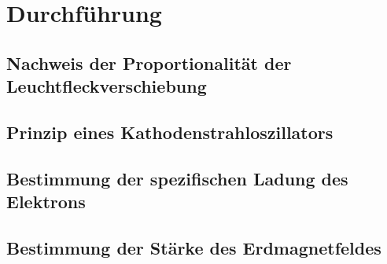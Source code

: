 
\section{Durchführung}
\label{sec:durchfuehrung}

\subsection{Nachweis der Proportionalität der Leuchtfleckverschiebung}

\subsection{Prinzip eines Kathodenstrahloszillators}

\subsection{Bestimmung der spezifischen Ladung des Elektrons}

\subsection{Bestimmung der Stärke des Erdmagnetfeldes}

